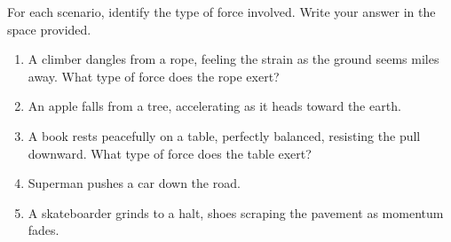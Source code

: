 \documentclass[]{exam}
\begin{document}
\begin{questions}

\question[5]
For each scenario, identify the type of force involved. Write your answer in the space provided.

\begin{enumerate} %
    \item A climber dangles from a rope, feeling the strain as the ground seems miles away. What type of force does the rope exert? \\[1ex]
    \item An apple falls from a tree, accelerating as it heads toward the earth. \\[1ex]
    \item A book rests peacefully on a table, perfectly balanced, resisting the pull downward. What type of force does the table exert? \\[1ex]
    \item Superman pushes a car down the road. \\[1ex]
    \item A skateboarder grinds to a halt, shoes scraping the pavement as momentum fades.\\[1ex]
\end{enumerate}





\end{questions}
\end{document}
